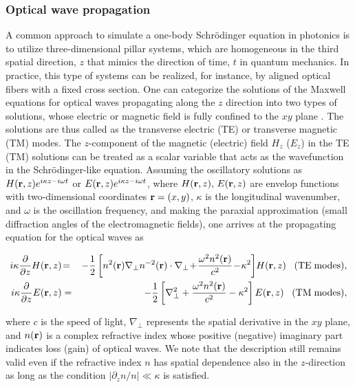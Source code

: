 \documentclass{tADP2e}
\theoremstyle{plain}
\newcommand{\eqn}[1]{
\begin{eqnarray}
	#1
\end{eqnarray}
}
\theoremstyle{plain}
\theoremstyle{definition}
\begin{document}
\subsubsection{Optical wave propagation\label{secpop}}
A common approach to simulate a one-body Schr{\"o}dinger equation in photonics is to utilize three-dimensional pillar systems, which are homogeneous in the third spatial direction, $z$ that mimics the direction of time, $t$ in quantum mechanics. In practice, this type of systems can be realized, for instance, by aligned optical fibers with a fixed cross section. 
One can categorize the solutions of the Maxwell equations for optical waves propagating along the $z$ direction into two types of solutions, whose electric or magnetic field is fully confined to the $xy$ plane \cite{JJD75}. The solutions are thus called as the transverse electric (TE) or transverse magnetic (TM) modes.  The $z$-component of the magnetic (electric) field $H_z$ ($E_z$) in the TE (TM) solutions can be treated as a scalar variable that acts as the wavefunction in the Schr{\"o}dinger-like equation. Assuming the oscillatory solutions as $ H({\bf r},z)e^{i\kappa z-i\omega t}$ or $E({\bf r},z) e^{i\kappa z-i\omega t}$, where $H({\bf r},z),\,E({\bf r},z)$ are envelop functions with two-dimensional coordinates ${\bf r}=(x,y)$, $\kappa$ is the longitudinal wavenumber, and $\omega$ is the oscillation frequency, and making the paraxial approximation (small diffraction angles of the electromagnetic fields), one arrives at the propagating equation for the optical waves as
\eqn{\label{temode}
i\kappa\frac{\partial}{\partial z}H({\bf r},z)&\!=\!&-\frac{1}{2}\left[n^2({\bf r})\nabla_\perp n^{-2}({\bf r})\cdot\nabla_\perp\!+\!\frac{\omega^2n^2({\bf r})}{c^2}\!-\!\kappa^2\right]\!H({\bf r},z)\;\;\;{\rm (TE\;modes)},\\
i\kappa\frac{\partial}{\partial z}E({\bf r},z)&=&-\frac{1}{2}\left[\nabla^2_\perp+\frac{\omega^2n^2({\bf r})}{c^2}-\kappa^2\right]E({\bf r},z)\;\;\;{\rm (TM\;modes)},
\label{tmmode}
}
where $c$ is the speed of light, $\nabla_\perp$ represents the spatial derivative in the $xy$ plane, and $n({\bf r})$ is a complex refractive index whose positive (negative) imaginary part indicates loss (gain) of optical waves. We note that the description still remains valid even if the refractive index $n$ has spatial dependence also in the $z$-direction as long as the condition $|\partial_{z}n/n|\ll\kappa$ is satisfied. 
\end{document}
